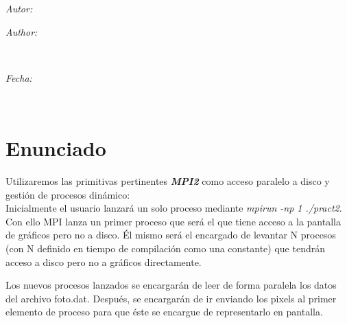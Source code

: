 \documentclass[11pt]{article}
\makeatletter
\newif\ifspanish %
\newif\ifmultipleauthors %
\newcommand{\dateText}{Fecha:}
\newcommand{\dateText}{Date:}
\let\theauthor\@author
\let\thedate\@date
\makeatother
\begin{document}
\begin{titlepage}
	\vspace*{\fill}
	\begin{minipage}{0.4\textwidth}
		\begin{flushleft} \large
			\ifspanish
				\ifmultipleauthors
					\emph{Autores:}\\
				\else
					\emph{Autor:}\\
				\fi
			\else
				\ifmultipleauthors
					\emph{Authors:}\\
				\else
					\emph{Author:}\\
				\fi
			\fi
			\theauthor
			\end{flushleft}
			\end{minipage}~
			\begin{minipage}{0.4\textwidth}
			\begin{flushright} \large
			\emph{\dateText} \\
			\thedate
		\end{flushright}
	\end{minipage}\\[2.25 cm]


\end{titlepage}


\tableofcontents
\pagebreak


\section{Enunciado}
Utilizaremos las primitivas pertinentes \textbf{\textit{MPI2}} como acceso paralelo a disco y
gestión de procesos dinámico:\\
Inicialmente el usuario lanzará un solo proceso mediante \textit{mpirun -np 1
./pract2}. Con ello MPI lanza un primer proceso que será el que tiene acceso a
la pantalla de gráficos pero no a disco. Él mismo será el encargado de levantar
N procesos (con N definido en tiempo de compilación como una constante) que
tendrán acceso a disco pero no a gráficos directamente.

Los nuevos procesos lanzados se encargarán de leer de forma paralela
los datos del archivo foto.dat. Después, se encargarán de ir enviando los pixels
al primer elemento de proceso para que éste se encargue de representarlo en
pantalla.
\end{document}
